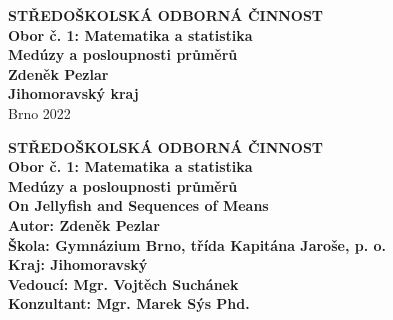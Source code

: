 \documentclass[12pt]{report}
\begin{document}
\newcommand{\ZZ}{{\mathbb{Z}}}
\newcommand{\cyc}[1]{{\langle #1 \rangle}}


\newtheorem{veta}{Věta}[section]


\theoremstyle{de}
\newtheorem{de}{Definition}[section]
\newtheorem{dusledek}[veta]{Důsledek}
\newtheorem{lemma}[veta]{Lemma}
\newtheorem{domnenka}[veta]{Domněnka}
\newtheorem*{lemma*}{Lemma}

\theoremstyle{definition}
\newtheorem{priklad}[veta]{Příklad}
\newtheorem{definice}[veta]{Definice}
\newtheorem{problem}[veta]{Problém}
\newtheorem{znaceni}[veta]{Značení}
\newtheorem*{umluva}{Úmluva}
\newtheorem*{poznamka}{Poznámka}
\newtheorem{dfn}[veta]{Definition}



\setlength{\parindent}{2ex}
\setlength{\emergencystretch}{3em}


\begin{titlepage}
{
\centering
\LARGE \textbf{STŘEDOŠKOLSKÁ ODBORNÁ ČINNOST}\\
\Large\textbf{Obor č. 1: Matematika a statistika}\\
\vspace{6cm}
\LARGE\textbf{Medúzy a posloupnosti průměrů}\\
}
\vspace{10cm}
{\noindent\large\bfseries Zdeněk Pezlar\\ 
	\large\bfseries Jihomoravský kraj\\ }
\center\large Brno 2022
	
\end{titlepage}

\begin{titlepage}
{
\centering
\LARGE \textbf{STŘEDOŠKOLSKÁ ODBORNÁ ČINNOST}\\
\Large\textbf{Obor č. 1: Matematika a statistika}\\
\vspace{6cm}
\LARGE\textbf{Medúzy a posloupnosti průměrů}\\
\vspace{1cm}
\LARGE\textbf{On Jellyfish and Sequences of Means}\\
}
\vspace{6cm}
{\noindent\large\bfseries Autor: Zdeněk Pezlar\\ 
	\large\bfseries Škola: Gymnázium Brno, třída Kapitána Jaroše, p. o.\\
    \large\bfseries Kraj: Jihomoravský \\
	\large\bfseries Vedoucí: Mgr. Vojtěch Suchánek\\
	 \large\bfseries Konzultant: Mgr. Marek Sýs Phd.	
	}
	

\end{titlepage}
\end{document}
